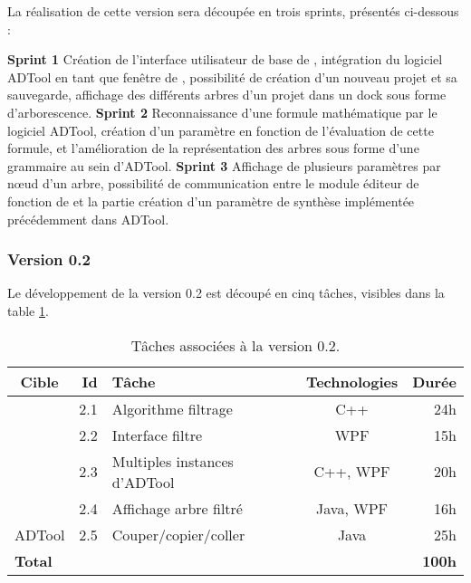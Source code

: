			
			La réalisation de cette version sera découpée en trois sprints, présentés ci-dessous :

			\noindent\textbf{Sprint 1} Création de l'interface utilisateur de base de \glasir{}, intégration du logiciel ADTool en tant que fenêtre de \glasir{}, possibilité de création d'un nouveau projet et sa sauvegarde, affichage des différents arbres d'un projet dans un dock sous forme d'arborescence.\newline
			\textbf{Sprint 2} Reconnaissance d'une formule mathématique par le logiciel ADTool, création d'un paramètre en fonction de l'évaluation de cette formule, et l'amélioration de la représentation des arbres sous forme d'une grammaire au sein d'ADTool.\newline
			\textbf{Sprint 3} Affichage de plusieurs paramètres par nœud d'un arbre, possibilité de communication entre le module éditeur de fonction de \glasir{} et la partie création d'un paramètre de synthèse implémentée précédemment dans ADTool.\newline


		\subsubsection{Version 0.2}
			Le développement de la version 0.2 est découpé en cinq tâches, visibles dans la {\sc table} \ref{tab:taches_units_2}.
			\begin{table}[h]
				\centering
				\begin{tabular}{|c|r|l|c|r|}
					\hline
					\textbf{Cible} & \textbf{Id} & \textbf{Tâche} & \textbf{Technologies} & \textbf{Durée}\\
					\hline

					\multirow{4}{*}{\glasir{}} & 2.1 & Algorithme filtrage & C++ & 24h\\
					\cline{2-5}
					 & 2.2 & Interface filtre & WPF & 15h\\
					\cline{2-5}
					 & 2.3 & Multiples instances d'ADTool & C++, WPF & 20h\\
					\cline{2-5}
					 & 2.4 & Affichage arbre filtré & Java, WPF & 16h\\
					\hline

					\multirow{1}{*}{ADTool} & 2.5 & Couper/copier/coller & \multirow{1}{*}{Java} & 25h\\
					\hline

					\multicolumn{4}{|l|}{\bf Total} & {\bf 100h}\\
					\hline
				\end{tabular}
				\caption{Tâches associées à la version 0.2.}
				\label{tab:taches_units_2}
			\end{table}
			
